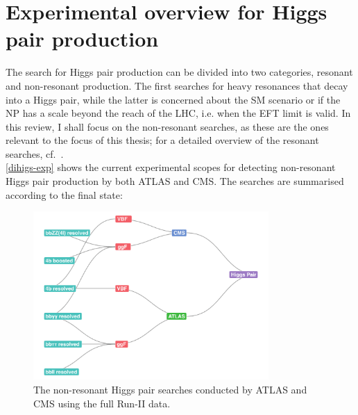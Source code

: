 \section{Experimental overview for Higgs pair production \label{exphh}  }
The search for Higgs pair production can be divided into two categories, resonant and non-resonant production. The first searches for heavy resonances that decay into a Higgs pair, while the latter is concerned about the SM scenario or if the NP has a scale beyond the reach of the LHC, i.e. when the EFT limit is valid. In this review, I shall focus on the non-resonant searches, as these are the ones relevant to the focus of this thesis; for a detailed overview of the resonant searches, cf.~\cite{DiMicco:2019ngk}.\\
%
\autoref{dihigs-exp} shows the current experimental scopes for detecting non-resonant Higgs pair production by both ATLAS and CMS. The searches are summarised according to the final state:
\begin{figure}[!htpb]
	\centering
	\includegraphics[width = 0.8\textwidth]{./figures/HH-exp-network}
	\caption{The non-resonant Higgs pair searches conducted by ATLAS and CMS using the full Run-II data.} 
	\label{dihigs-exp}
\end{figure}
